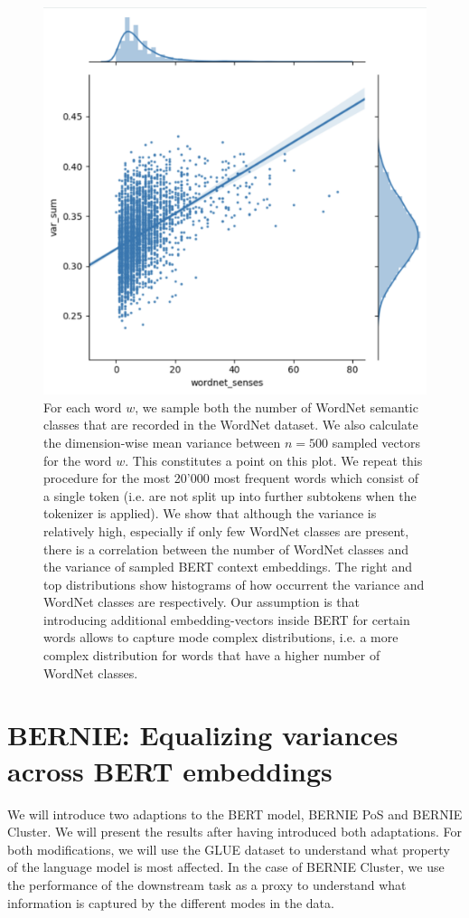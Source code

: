 \documentclass[a4paper,12pt,twoside,openright]{report}
\begin{document}
\begin{figure}[H]
	\center
  \includegraphics[width=0.5\linewidth]{./assets/experiments/variance_in_BERT_embeddings.png}
  \caption{
  	For each word $w$, we sample both the number of WordNet semantic classes that are recorded in the WordNet dataset. We also calculate the dimension-wise mean variance between $n=500$ sampled vectors for the word $w$. 
  	This constitutes a point on this plot.
  	We repeat this procedure for the most 20'000 most frequent words which consist of a single token (i.e. are not split up into further subtokens when the tokenizer is applied).
	We show that although the variance is relatively high, especially if only few WordNet classes are present, there is a correlation between the number of WordNet classes and the variance of sampled BERT context embeddings.
	The right and top distributions show histograms of how occurrent the variance and WordNet classes are respectively.
	Our assumption is that introducing additional embedding-vectors inside BERT for certain words allows to capture mode complex distributions, i.e. a more complex distribution for words that have a higher number of WordNet classes.
  }
  \label{fig:BERT_variance}
\end{figure}

\section{BERNIE: Equalizing variances across BERT embeddings}

We will introduce two adaptions to the BERT model, BERNIE PoS and BERNIE Cluster.
We will present the results after having introduced both adaptations.
For both modifications, we will use the GLUE dataset to understand what property of the language model is most affected.
In the case of BERNIE Cluster, we use the performance of the downstream task as a proxy to understand what information is captured by the different modes in the data.
\end{document}
